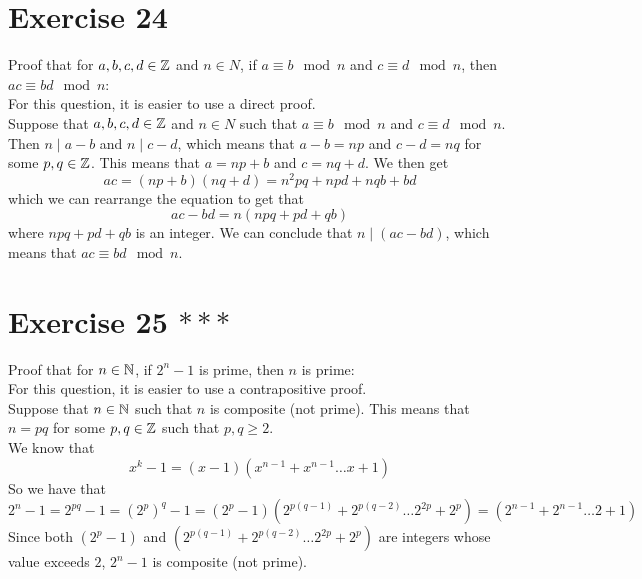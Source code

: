 \documentclass[12pt]{article}
\begin{document}
    \section*{Exercise 24}
    Proof that for $a, b, c, d \in \mathbb{Z}$ and $n \in N$,
    if $a \equiv b \mod n$ and $c \equiv d \mod n$,
    then $ac \equiv bd \mod n$: \\
    For this question, it is easier to use a direct proof. \\
    Suppose that $a, b, c, d \in \mathbb{Z}$ and $n \in N$
    such that $a \equiv b \mod n$ and $c \equiv d \mod n$.
    Then $n \mid a - b$ and $n \mid c - d$,
    which means that $a-b = np$ and $c -d = nq$
    for some $p, q \in \mathbb{Z}$.
    This means that $a = np + b$ and $c = nq + d$.
    We then get
    \[ ac = (np+b)(nq+d) = n^2pq + npd + nqb + bd \]
    which we can rearrange the equation to get that
    \[ ac - bd = n(npq + pd + qb) \]
    where $npq + pd + qb$ is an integer.
    We can conclude that $n \mid (ac - bd)$,
    which means that $ac \equiv bd \mod n$. \\

    \section*{Exercise 25 $***$}
    Proof that for $n \in \mathbb{N}$,
    if $2^n - 1$ is prime,
    then $n$ is prime: \\
    For this question, it is easier to use a contrapositive proof. \\
    Suppose that $n \in \mathbb{N}$
    such that $n$ is composite (not prime).
    This means that $n = pq$ for some $p, q \in \mathbb{Z}$
    such that $p, q \geqslant 2$. \\
    We know that
    \[ x^k - 1 = (x-1)(x^{n-1} + x^{n-1} \dots x + 1) \]
    So we have that
    \[ 2^n - 1 = 2^{pq} - 1 = (2^p)^q - 1
    = (2^p - 1)(2^{p(q-1)} + 2^{p(q-2)} \dots 2^{2p} + 2^p) = 
    (2^{n-1} + 2^{n-1} \dots 2 + 1) \]
    Since both $(2^p - 1)$
    and $(2^{p(q-1)} + 2^{p(q-2)} \dots 2^{2p} + 2^p)$
    are integers whose value exceeds $2$,
    $2^n - 1$ is composite (not prime). \\
\end{document}
